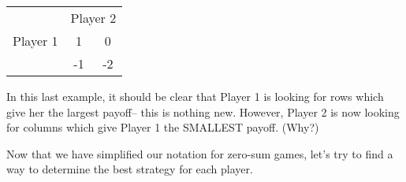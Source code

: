 \begin{enumerate}
\begin{table}[h]
\centering

\begin{tabular}{ccc}
                      & \multicolumn{2}{c}{Player 2}                                                  \\ \cline{2-3} 
\multicolumn{1}{l|}{Player 1}  & \multicolumn{1}{c|}{1} & \multicolumn{1}{c|}{0} \\ \cline{2-3} 
\multicolumn{1}{l|}{}  & \multicolumn{1}{c|}{-1} & \multicolumn{1}{c|}{-2} \\ \cline{2-3} 
\end{tabular}
\end{table}

 

\end{enumerate}

In this last example, it should be clear that Player 1 is looking for rows which give her the largest payoff-- this is nothing new. However, Player 2 is now looking for columns which give Player 1 the SMALLEST payoff. (Why?) 

Now that we have simplified our notation for zero-sum games, let's try to find a way to determine the best strategy for each player.

